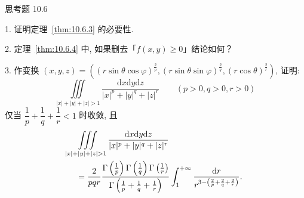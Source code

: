 \begin{exblock}{思考题 10.6}

1. 证明定理~\ref{thm:10.6.3} 的必要性.

2. 定理~\ref{thm:10.6.4} 中, 如果删去「$f(x,y) \geqslant 0$」结论如何？

3. 作变换
$(x,y,z) = \left( (r\sin\theta\cos\varphi)^{\frac{2}{p}},
(r\sin\theta\sin\varphi)^{\frac{2}{q}}, (r\cos\theta)^{\frac{2}{r}} \right)$, 证明:
\[
\iiint\limits_{|x|+|y|+|z| > 1}
\frac{\mathrm{d}x\mathrm{d}y\mathrm{d}z}{|x|^{p}+|y|^{q}+|z|^{r}}
\qquad (p > 0, q > 0, r > 0)
\]
仅当 $\dfrac{1}{p} + \dfrac{1}{q} + \dfrac{1}{r} < 1$ 时收敛, 且
\[
\begin{aligned}
&\iiint\limits_{|x|+|y|+|z| > 1}
\frac{\mathrm{d}x\mathrm{d}y\mathrm{d}z}{|x|^{p}+|y|^{q}+|z|^{r}} \notag\\
&\quad= \frac{2}{pqr}
\frac{\Gamma\left( \frac{1}{p} \right)\Gamma\left( \frac{1}{q} \right)
\Gamma\left( \frac{1}{r} \right)}
{\Gamma\left( \frac{1}{p}+\frac{1}{q}+\frac{1}{r} \right)}
\int_{1}^{+\infty} \frac{\mathrm{d}r}
{r^{3-\left( \frac{2}{p}+\frac{2}{q}+\frac{2}{r} \right)}}. \notag
\end{aligned}
\]

\end{exblock}


